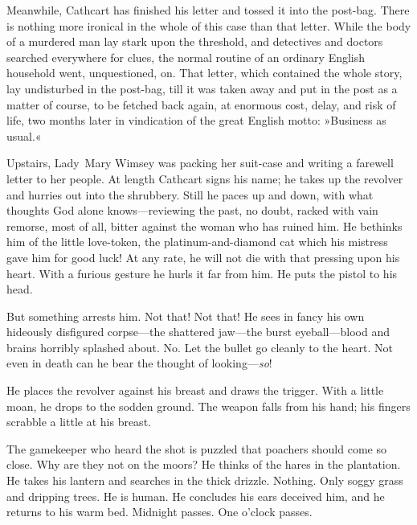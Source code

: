 \begin{dialogue}
\smallskip

Meanwhile, Cathcart has finished his letter and tossed it into the post-bag. There is nothing more ironical in the whole of this case than that letter. While the body of a murdered man lay stark upon the threshold, and detectives and doctors searched everywhere for clues, the normal routine of an ordinary English household went, unquestioned, on. That letter, which contained the whole story, lay undisturbed in the post-bag, till it was taken away and put in the post as a matter of course, to be fetched back again, at enormous cost, delay, and risk of life, two months later in vindication of the great English motto: »Business as usual.«

\smallskip

Upstairs, Lady~Mary Wimsey was packing her suit-case and writing a farewell letter to her people. At length Cathcart signs his name; he takes up the revolver and hurries out into the shrubbery. Still he paces up and down, with what thoughts God alone knows—reviewing the past, no doubt, racked with vain remorse, most of all, bitter against the woman who has ruined him. He bethinks him of the little love-token, the platinum-and-diamond cat which his mistress gave him for good luck! At any rate, he will not die with that pressing upon his heart. With a furious gesture he hurls it far from him. He puts the pistol to his head.

\smallskip

But something arrests him. Not that! Not that! He sees in fancy his own hideously disfigured corpse—the shattered jaw—the burst eyeball—blood and brains horribly splashed about. No. Let the bullet go cleanly to the heart. Not even in death can he bear the thought of looking—\textit{so}!

\smallskip

He places the revolver against his breast and draws the trigger. With a little moan, he drops to the sodden ground. The weapon falls from his hand; his fingers scrabble a little at his breast.

\smallskip

The gamekeeper who heard the shot is puzzled that poachers should come so close. Why are they not on the moors? He thinks of the hares in the plantation. He takes his lantern and searches in the thick drizzle. Nothing. Only soggy grass and dripping trees. He is human. He concludes his ears deceived him, and he returns to his warm bed. Midnight passes. One o'clock passes.

\smallskip


\end{dialogue}
